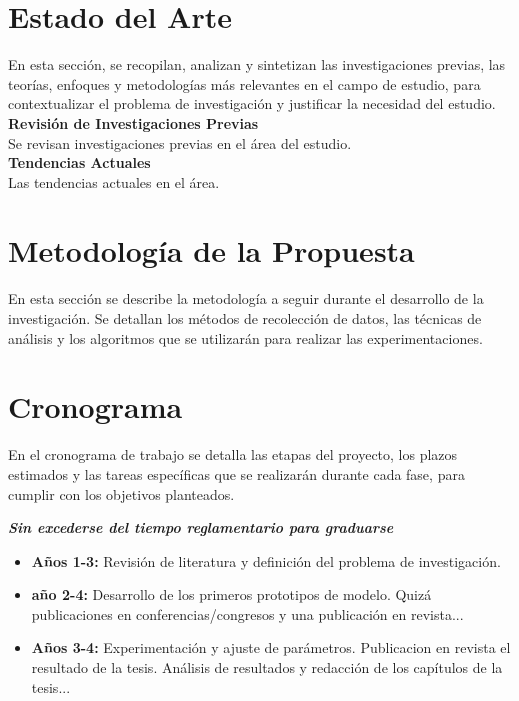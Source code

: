\documentclass[a4paper,12pt]{article}
\begin{document}
\section{\textbf{Estado del Arte}}
En esta sección, se recopilan, analizan y sintetizan las investigaciones previas, las teorías, enfoques y metodologías más relevantes en el campo de estudio, para contextualizar el problema de investigación y justificar la necesidad del estudio. \cite{referencia2} \\
\textbf{{Revisión de Investigaciones Previas}} \\
Se revisan investigaciones previas en el área del estudio. \\
\textbf{{Tendencias Actuales}}\\
Las tendencias actuales en el área.


\newpage

\section{Metodología de la Propuesta}
En esta sección se describe la metodología a seguir durante el desarrollo de la investigación. Se detallan los métodos de recolección de datos, las técnicas de análisis y los algoritmos que se utilizarán para realizar las experimentaciones.
\cite{simpson2019largeannotatedmedicalimage}


\newpage


\section{Cronograma}
En el cronograma de trabajo se detalla las etapas del proyecto, los plazos estimados y las tareas específicas que se realizarán durante cada fase, para cumplir con los objetivos planteados.

\textbf{\emph{Sin excederse del tiempo reglamentario para graduarse}}


\begin{itemize}
	\item \textbf{Años 1-3:} Revisión de literatura y definición del problema de investigación.
	\item \textbf{año 2-4:} Desarrollo de los primeros prototipos de modelo. Quizá publicaciones en conferencias/congresos y una publicación en revista...
	\item \textbf{Años 3-4:} Experimentación y ajuste de parámetros. Publicacion en revista el resultado de la tesis.
	      Análisis de resultados y redacción de los capítulos de la tesis...
\end{itemize}
\end{document}
